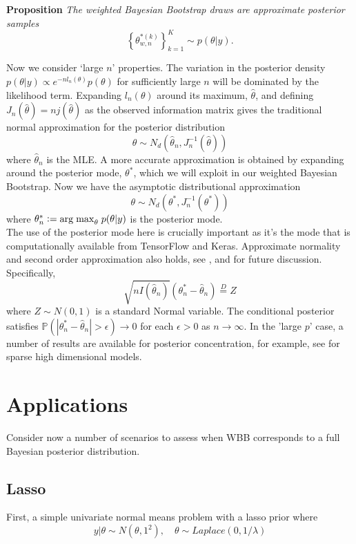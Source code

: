 \documentclass[11pt]{article}%
\newcommand{\defeq}{\mathrel{\mathop:}=}
\newcommand{\eqdist}{\stackrel{D}{=}}
\begin{document}
\noindent \textbf{Proposition}
{\it The weighted Bayesian Bootstrap draws are approximate posterior samples
$$
\left\{\theta^{*(k)}_{w,n} \right\}_{k=1}^K \sim p(\theta | y).
$$}

\noindent Now we consider `large $n$' properties. The variation in the posterior density $p(\theta|y) \propto e^{-n l_n(\theta)}p(\theta)$ for sufficiently large $n$ will be dominated by the likelihood term. Expanding $l_n(\theta)$ around its maximum, $\hat\theta$, and defining $J_n(\hat\theta) = nj(\hat\theta)$ as the observed information matrix gives the traditional normal approximation for the posterior distribution
$$
\theta \sim N_d \left( \hat\theta_n, J_n^{-1}(\hat\theta)\right)
$$
where $ \hat{\theta}_n$ is the MLE. A more accurate approximation is obtained by expanding around the posterior mode, $\theta^*$, which we will exploit in our weighted Bayesian Bootstrap. Now we have the asymptotic distributional approximation 
$$
\theta \sim N_d \left( \theta^*, J_n^{-1}(\theta^*)\right)
$$
where $\theta^*_n \defeq {\rm arg \; max}_\theta \; p( \theta|y) $ is the posterior mode. \\

\noindent The use of the posterior mode here is crucially important as it's the mode that is computationally available from TensorFlow and Keras. Approximate normality and second order approximation also holds, see \cite{johnson1970asymptotic}, \cite{Bertail} and \cite{newton1991approximate, newton1994approximate} for future discussion. Specifically,
$$
\sqrt{ n I ( \hat{\theta}_n )} \left ( {\theta}^*_n - \hat{\theta}_n \right ) \eqdist Z
$$
where $Z \sim N(0,1)$ is a standard Normal variable. The conditional posterior satisfies $\mathbb{P} \left ( | {\theta}^*_n - \hat{\theta}_n | > \epsilon \right ) \rightarrow 0$ for each $ \epsilon > 0 $ as $ n \rightarrow \infty $. In the 'large $p$' case, a number of results are available for posterior concentration, for example, see \cite{van2014horseshoe} for sparse high dimensional models.

\section{Applications}
\noindent Consider now a number of scenarios to assess when WBB corresponds to a full Bayesian posterior distribution. 
\subsection{Lasso}
First, a simple univariate normal means problem with a  lasso prior where  
$$
y|\theta \sim N(\theta,1^2), \quad \theta \sim Laplace (0,1/\lambda)
$$
\end{document}
